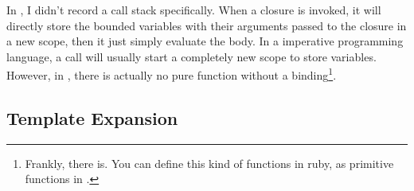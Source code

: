 In \revo, I didn't record a call stack specifically. When a closure is
invoked, it will directly store the bounded variables with their
arguments passed to the closure in a new scope, then it just simply
evaluate the body. In a imperative programming language, a call will
usually start a completely new scope to store variables. However, in
\revo, there is actually no pure function without a
binding\footnote{Frankly, there is. You can define this kind of
  functions in ruby, as primitive functions in \revo.}.


\subsection{Template Expansion}







